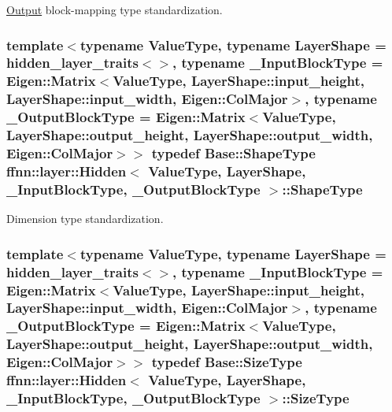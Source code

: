 \hyperlink{classffnn_1_1layer_1_1_output}{Output} block-\/mapping type standardization. 

\hypertarget{classffnn_1_1layer_1_1_hidden_abdfcf81b3846fae3b19a207424695df0}{
\subsubsection[{Shape\-Type}]{\setlength{\rightskip}{0pt plus 5cm}template$<$typename Value\-Type, typename Layer\-Shape = hidden\-\_\-layer\-\_\-traits$<$$>$, typename \-\_\-\-Input\-Block\-Type = Eigen\-::\-Matrix$<$\-Value\-Type, Layer\-Shape\-::input\-\_\-height,  Layer\-Shape\-::input\-\_\-width,  Eigen\-::\-Col\-Major$>$, typename \-\_\-\-Output\-Block\-Type = Eigen\-::\-Matrix$<$\-Value\-Type, Layer\-Shape\-::output\-\_\-height, Layer\-Shape\-::output\-\_\-width, Eigen\-::\-Col\-Major$>$$>$ typedef {\bf Base\-::\-Shape\-Type} {\bf ffnn\-::layer\-::\-Hidden}$<$ Value\-Type, Layer\-Shape, \-\_\-\-Input\-Block\-Type, \-\_\-\-Output\-Block\-Type $>$\-::{\bf Shape\-Type}}}\label{classffnn_1_1layer_1_1_hidden_abdfcf81b3846fae3b19a207424695df0}


Dimension type standardization. 

\hypertarget{classffnn_1_1layer_1_1_hidden_ac148012cb544a39841675601090cd4c8}{
\subsubsection[{Size\-Type}]{\setlength{\rightskip}{0pt plus 5cm}template$<$typename Value\-Type, typename Layer\-Shape = hidden\-\_\-layer\-\_\-traits$<$$>$, typename \-\_\-\-Input\-Block\-Type = Eigen\-::\-Matrix$<$\-Value\-Type, Layer\-Shape\-::input\-\_\-height,  Layer\-Shape\-::input\-\_\-width,  Eigen\-::\-Col\-Major$>$, typename \-\_\-\-Output\-Block\-Type = Eigen\-::\-Matrix$<$\-Value\-Type, Layer\-Shape\-::output\-\_\-height, Layer\-Shape\-::output\-\_\-width, Eigen\-::\-Col\-Major$>$$>$ typedef {\bf Base\-::\-Size\-Type} {\bf ffnn\-::layer\-::\-Hidden}$<$ Value\-Type, Layer\-Shape, \-\_\-\-Input\-Block\-Type, \-\_\-\-Output\-Block\-Type $>$\-::{\bf Size\-Type}}}\label{classffnn_1_1layer_1_1_hidden_ac148012cb544a39841675601090cd4c8}


